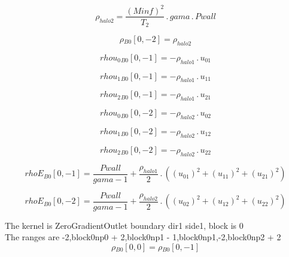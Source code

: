 \documentclass{article}
\begin{document}
\begin{dmath}\rho_{halo 2} = \frac{\left(Minf \right)^{2}}{T_{2}} \,.\, gama \,.\, Pwall\end{dmath}

\begin{dmath}{\rho{_{B0}}}[{0,-2}] = \rho_{halo 2}\end{dmath}

\begin{dmath}{rhou_{0}{_{B0}}}[{0,-1}] = - \rho_{halo 1} \,.\, u_{01}\end{dmath}

\begin{dmath}{rhou_{1}{_{B0}}}[{0,-1}] = - \rho_{halo 1} \,.\, u_{11}\end{dmath}

\begin{dmath}{rhou_{2}{_{B0}}}[{0,-1}] = - \rho_{halo 1} \,.\, u_{21}\end{dmath}

\begin{dmath}{rhou_{0}{_{B0}}}[{0,-2}] = - \rho_{halo 2} \,.\, u_{02}\end{dmath}

\begin{dmath}{rhou_{1}{_{B0}}}[{0,-2}] = - \rho_{halo 2} \,.\, u_{12}\end{dmath}

\begin{dmath}{rhou_{2}{_{B0}}}[{0,-2}] = - \rho_{halo 2} \,.\, u_{22}\end{dmath}

\begin{dmath}{rhoE{_{B0}}}[{0,-1}] = \frac{Pwall}{gama - 1} + \frac{\rho_{halo 1}}{2} \,.\, \left(\left(u_{01} \right)^{2} + \left(u_{11} \right)^{2} + \left(u_{21} \right)^{2}\right)\end{dmath}

\begin{dmath}{rhoE{_{B0}}}[{0,-2}] = \frac{Pwall}{gama - 1} + \frac{\rho_{halo 2}}{2} \,.\, \left(\left(u_{02} \right)^{2} + \left(u_{12} \right)^{2} + \left(u_{22} \right)^{2}\right)\end{dmath}

\noindent The kernel is ZeroGradientOutlet boundary dir1 side1, block is 0\\\noindent The ranges are -2,block0np0 + 2,block0np1 - 1,block0np1,-2,block0np2 + 2\\\begin{dmath}{\rho{_{B0}}}[{0,0}] = {\rho{_{B0}}}[{0,-1}]\end{dmath}
\end{document}

